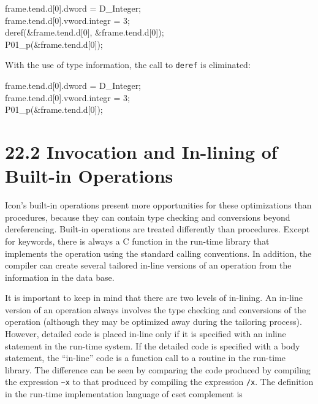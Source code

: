 \goodbreak
\begin{iconcode}
\>frame.tend.d[0].dword = D\_Integer;\\
\>frame.tend.d[0].vword.integr = 3;\\
\>deref(\&frame.tend.d[0], \&frame.tend.d[0]);\\
\>P01\_p(\&frame.tend.d[0]);\\
\end{iconcode}

\noindent
With the use of type information, the call to \texttt{deref} is eliminated: 

\goodbreak
\begin{iconcode}
\>frame.tend.d[0].dword = D\_Integer;\\
\>frame.tend.d[0].vword.integr = 3;\\
\>P01\_p(\&frame.tend.d[0]);\\
\end{iconcode}

\section[22.2 Invocation and In-lining of Built-in Operations]{22.2 Invocation and In-lining of Built-in Operations}

Icon's built-in operations present more opportunities for these
optimizations than procedures, because they can contain type checking
and conversions beyond dereferencing. Built-in operations are treated
differently than procedures. Except for keywords, there is always a C
function in the run-time library that implements the operation using
the standard calling conventions. In addition, the compiler can create
several tailored in-line versions of an operation from the information
in the data base.

It is important to keep in mind that there are two levels of
in-lining. An in-line version of an operation always involves the type
checking and conversions of the operation (although they may be
optimized away during the tailoring process). However, detailed code
is placed in-line only if it is specified with an inline statement in
the run-time system. If the detailed code is specified with a body
statement, the ``in-line'' code is a function call to a routine in the
run-time library. The difference can be seen by comparing the code
produced by compiling the expression \texttt{\textasciitilde{}x} to
that produced by compiling the expression \texttt{/x}. The definition
in the run-time implementation language of cset complement is


